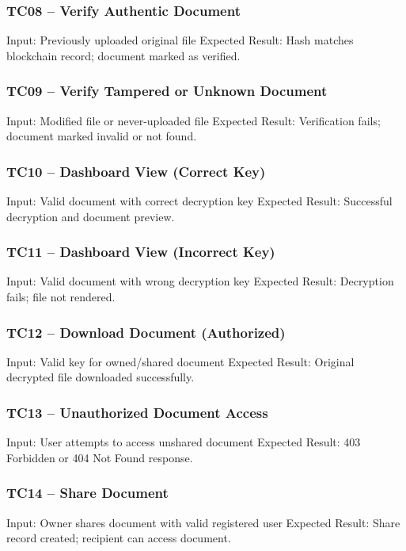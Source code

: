 \documentclass[12pt]{article}
\begin{document}
\subsubsection{TC08 -- Verify Authentic Document} 
Input: Previously uploaded original file \newline
Expected Result: Hash matches blockchain record; document marked as verified.

\subsubsection{TC09 -- Verify Tampered or Unknown Document} 
Input: Modified file or never-uploaded file \newline
Expected Result: Verification fails; document marked invalid or not found.

\subsubsection{TC10 -- Dashboard View (Correct Key)} 
Input: Valid document with correct decryption key \newline
Expected Result: Successful decryption and document preview.

\subsubsection{TC11 -- Dashboard View (Incorrect Key)} 
Input: Valid document with wrong decryption key \newline
Expected Result: Decryption fails; file not rendered.

\subsubsection{TC12 -- Download Document (Authorized)} 
Input: Valid key for owned/shared document \newline
Expected Result: Original decrypted file downloaded successfully.

\subsubsection{TC13 -- Unauthorized Document Access} 
Input: User attempts to access unshared document \newline
Expected Result: 403 Forbidden or 404 Not Found response.

\subsubsection{TC14 -- Share Document} 
Input: Owner shares document with valid registered user\newline
Expected Result: Share record created; recipient can access document.
\end{document}
